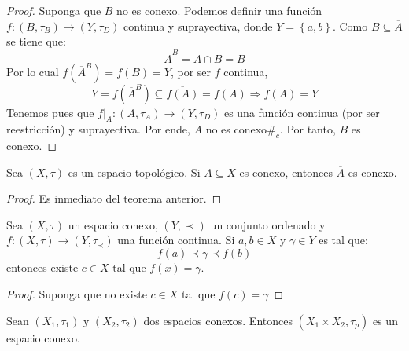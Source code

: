 \documentclass[12pt]{report}
\theoremstyle{largebreak}
\newcommand\cf[3]{\ensuremath{#1:#2\rightarrow#3}}
\newcommand\contradiction{\ensuremath{\#_c}}
\newcommand{\Cls}[1]{\ensuremath{\overline{#1}}}
\begin{document}
    \begin{proof}
        Suponga que $B$ no es conexo. Podemos definir una función $\cf{f}{(B,\tau_B)}{(Y,\tau_D)}$ continua y suprayectiva, donde $Y=\left\{a,b\right\}$. Como $B\subseteq \Cls{A}$ se tiene que:
        \begin{equation*}
            \Cls{A}^B=\Cls{A}\cap B=B
        \end{equation*}
        Por lo cual $f\left(\Cls{A}^B\right)=f(B)=Y$, por ser $f$ continua,
        \begin{equation*}
            Y=f\left(\Cls{A}^B\right)\subseteq\Cls{f(A)}=f(A)\Rightarrow f(A)=Y
        \end{equation*}
        Tenemos pues que $\cf{f\big|_A}{(A,\tau_A)}{(Y,\tau_D)}$ es una función continua (por ser reestricción) y suprayectiva. Por ende, $A$ no es conexo\contradiction. Por tanto, $B$ es conexo. 
    \end{proof}

    \begin{cor}
        Sea $(X,\tau)$ es un espacio topológico. Si $A\subseteq X$ es conexo, entonces $\Cls{A}$ es conexo.  
    \end{cor}

    \begin{proof}
        Es inmediato del teorema anterior.
    \end{proof}

    \begin{theor}
        Sea $(X,\tau)$ un espacio conexo, $(Y,\prec)$ un conjunto ordenado y $\cf{f}{(X,\tau)}{(Y,\tau_\prec)}$ una función continua. Si $a,b\in X$ y $\gamma\in Y$ es tal que:
        \begin{equation*}
            f(a)\prec \gamma\prec f(b)
        \end{equation*}
        entonces existe $c\in X$ tal que $f(x)=\gamma$.
    \end{theor}

    \begin{proof}
        Suponga que no existe $c\in X$ tal que $f(c)=\gamma$
    \end{proof}

    \begin{propo}
        Sean $(X_1,\tau_1)$ y $(X_2,\tau_2)$ dos espacios conexos. Entonces $(X_1\times X_2,\tau_p )$ es un espacio conexo.
    \end{propo}
\end{document}
